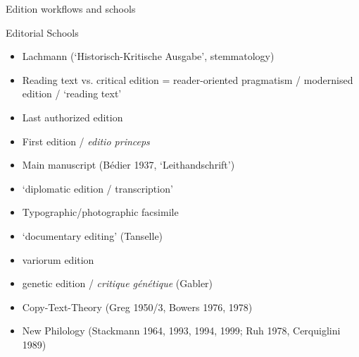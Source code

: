 \begin{frame}[allowframebreaks]{Edition workflows and schools}
\framebreak

\begin{block}{Editorial Schools}
\begin{multicols}{2}
\begin{itemize}
\item Lachmann (`Historisch-Kritische Ausgabe', stemmatology)
\item Reading text vs. critical edition = reader-oriented pragmatism / modernised edition / `reading text'
\item  Last authorized edition
\item  First edition / \emph{editio princeps}
\item Main manuscript (Bédier 1937, `Leithandschrift')
\item `diplomatic edition / transcription'
\item Typographic/photographic facsimile
\item `documentary editing' (Tanselle)
\item variorum edition
\item genetic edition / \emph{critique génétique} (Gabler)
\item Copy-Text-Theory (Greg 1950/3, Bowers 1976, 1978)
\item New Philology (Stackmann 1964, 1993, 1994, 1999; Ruh 1978, Cerquiglini 1989)
\end{itemize}
\end{multicols}
\end{block}

\end{frame}




